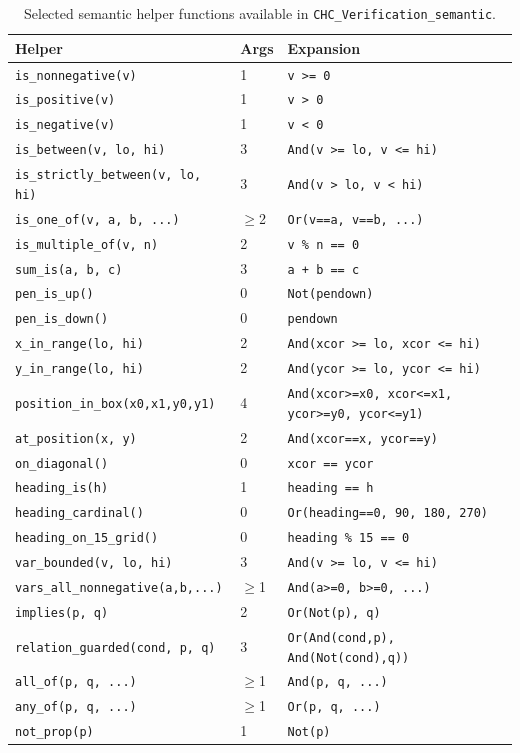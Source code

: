 \begin{table}[H]
\centering
\small
\begin{tabular}{p{5.2cm} p{2.0cm} p{7.5cm}}
\toprule
\textbf{Helper} & \textbf{Args} & \textbf{Expansion} \\
\midrule
\texttt{is\_nonnegative(v)} & 1 & \texttt{v >= 0} \\
\texttt{is\_positive(v)} & 1 & \texttt{v > 0} \\
\texttt{is\_negative(v)} & 1 & \texttt{v < 0} \\
\texttt{is\_between(v, lo, hi)} & 3 & \texttt{And(v >= lo, v <= hi)} \\
\texttt{is\_strictly\_between(v, lo, hi)} & 3 & \texttt{And(v > lo, v < hi)} \\
\texttt{is\_one\_of(v, a, b, ...)} & $\ge$2 & \texttt{Or(v==a, v==b, ...)} \\
\texttt{is\_multiple\_of(v, n)} & 2 & \texttt{v \% n == 0} \\
\texttt{sum\_is(a, b, c)} & 3 & \texttt{a + b == c} \\
\texttt{pen\_is\_up()} & 0 & \texttt{Not(pendown)} \\
\texttt{pen\_is\_down()} & 0 & \texttt{pendown} \\
\texttt{x\_in\_range(lo, hi)} & 2 & \texttt{And(xcor >= lo, xcor <= hi)} \\
\texttt{y\_in\_range(lo, hi)} & 2 & \texttt{And(ycor >= lo, ycor <= hi)} \\
\texttt{position\_in\_box(x0,x1,y0,y1)} & 4 & \texttt{And(xcor>=x0, xcor<=x1, ycor>=y0, ycor<=y1)} \\
\texttt{at\_position(x, y)} & 2 & \texttt{And(xcor==x, ycor==y)} \\
\texttt{on\_diagonal()} & 0 & \texttt{xcor == ycor} \\
\texttt{heading\_is(h)} & 1 & \texttt{heading == h} \\
\texttt{heading\_cardinal()} & 0 & \texttt{Or(heading==0, 90, 180, 270)} \\
\texttt{heading\_on\_15\_grid()} & 0 & \texttt{heading \% 15 == 0} \\
\texttt{var\_bounded(v, lo, hi)} & 3 & \texttt{And(v >= lo, v <= hi)} \\
\texttt{vars\_all\_nonnegative(a,b,...)} & $\ge$1 & \texttt{And(a>=0, b>=0, ...)} \\
\texttt{implies(p, q)} & 2 & \texttt{Or(Not(p), q)} \\
\texttt{relation\_guarded(cond, p, q)} & 3 & \texttt{Or(And(cond,p), And(Not(cond),q))} \\
\texttt{all\_of(p, q, ...)} & $\ge$1 & \texttt{And(p, q, ...)} \\
\texttt{any\_of(p, q, ...)} & $\ge$1 & \texttt{Or(p, q, ...)} \\
\texttt{not\_prop(p)} & 1 & \texttt{Not(p)} \\
\bottomrule
\end{tabular}
\caption{Selected semantic helper functions available in \texttt{CHC\_Verification\_semantic}.}
\label{tab:helpers}
\end{table}

